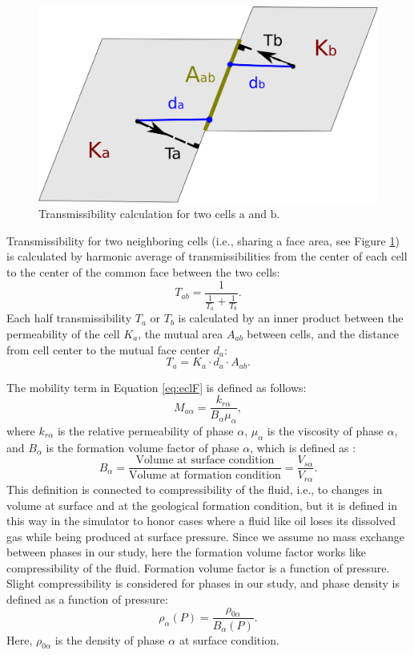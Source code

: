 \begin{figure}
 \centering{}
 \includegraphics[width=0.4\linewidth]{./figurer/trans}
 \caption{Transmissibility calculation for two cells $\mbox{a}$ and $\mbox{b}$.}
 \label{fig:tran}
\end{figure}

Transmissibility for two neighboring cells (i.e., sharing a face area, see
Figure \ref{fig:tran}) is
calculated by harmonic average of transmissibilities from the center of each
cell to the center of the common face between the two cells:
\begin{equation}
 T_{ab}=\frac{1}{\frac{1}{T_a}+\frac{1}{T_b}}.
 \label{eq:Thav}
\end{equation} Each half transmissibility $T_{a}$ or $T_{b}$ is calculated by an inner product
between the permeability of the cell $K_a $, the mutual area $A_{ab}$ between cells, and the distance from cell center to the mutual face center $d_a$:
\begin{equation}
  T_a = K_a \cdot d_a \cdot A_{ab}.
  \label{eq:tran}
\end{equation}

The mobility term in Equation \ref{eq:eclF} is defined as follows:
\begin{equation}
 M_{a\alpha}=\frac{k_{r\alpha}}{B_\alpha \mu_\alpha},
 \label{eq:mob}
\end{equation} where $k_{r\alpha}$ is the relative permeability of phase
$\alpha$, $\mu_\alpha$ is the viscosity of phase $\alpha$, and $B_\alpha$ is the
formation volume factor of phase $\alpha$, which is defined as :
\begin{equation}
 B_\alpha=\frac{\mbox{Volume at surface condition}}{\mbox{Volume at formation
condition}}=\frac{V_{s\alpha}}{V_{r\alpha}}.  
\end{equation} This definition is connected to compressibility
of the fluid, i.e., to changes in volume at surface and at the geological formation condition, but it is defined in this way in the simulator to honor cases where a
fluid like oil loses its dissolved gas while being produced at surface pressure.
Since we assume no mass exchange between phases in our study, here the formation
volume factor works like compressibility of the fluid. Formation volume factor
is a function of pressure. Slight compressibility is considered for phases in our study, and phase density
is defined as a function of pressure:
\begin{equation}
 \rho_\alpha(P) =\frac{\rho_{0\alpha}}{B_\alpha(P)}.
 \label{eq:rho}
\end{equation} Here, $\rho_{0\alpha}$ is the density of phase $\alpha$ at
surface condition.

